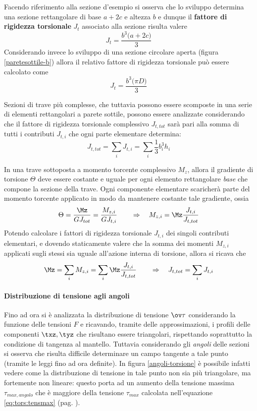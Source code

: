     		Facendo riferimento alla sezione d'esempio si osserva che lo sviluppo determina una sezione rettangolare di base $a+2c$ e altezza $b$ e dunque il \textbf{fattore di rigidezza torsionale} $J_t$ associato alla sezione risulta valere
    		\[ J_t = \frac{b^3\big(a+2c\big)}{3} \]
    		Considerando invece lo sviluppo di una sezione circolare aperta (figura \ref{paretesottile-b}) allora il relativo fattore di rigidezza torsionale può essere calcolato come
    		\[ J_t = \frac{b^3\big(\pi D\big)}{3}\]
    		
    		
    		Sezioni di trave più complesse, che tuttavia possono essere scomposte in una serie di elementi rettangolari a parete sottile, possono essere analizzate considerando che il fattore di rigidezza torsionale complessivo $J_{t,tot}$ sarà pari alla somma di tutti i contributi $J_{t,i}$ che ogni parte elementare determina:
    		\[ J_{t,tot} = \sum_i J_{t,i} = \sum_i \frac 1 3 b^3_ih_i \]
    		
    		\begin{dimostrazione}
    			In una trave sottoposta a momento torcente complessivo $M_z$, allora il gradiente di torsione $\Theta$ deve essere costante e uguale per ogni elemento rettangolare \textit{base} che compone la sezione della trave. Ogni componente elementare scaricherà parte del momento torcente applicato in modo da mantenere costante tale gradiente, ossia
    			\[ \Theta = \frac{\Mz}{GJ_{tot}} = \frac{M_{z,i}}{GJ_{t,i}} \qquad \Rightarrow \quad M_{z,i} = \Mz \frac{J_{t,i}}{J_{t,tot}} \]
    			Potendo calcolare i fattori di rigidezza torsionale $J_{t,i}$ dei singoli contributi elementari, e dovendo  staticamente valere che la somma dei momenti $M_{z,i}$ applicati sugli stessi sia uguale all'azione interna di torsione, allora si ricava che
    			\[ \Mz = \sum_i M_{z,i} = \sum_i \Mz \frac{J_{t,i}}{J_{t,tot}} \qquad \Rightarrow \quad J_{t,tot} = \sum_i J_{t,i} \]
    		\end{dimostrazione}
    	
    		\paragraph{Distribuzione di tensione agli angoli} Fino ad ora si è analizzata la distribuzione di tensione $\ov \tau$ considerando la funzione delle tensioni $F$ e ricavando, tramite delle approssimazioni, i profili delle componenti $\txz,\tyz$ che risultano essere triangolari, rispettando soprattutto la condizione di tangenza al mantello. Tuttavia considerando gli \textit{angoli} delle sezioni si osserva che risulta difficile determinare un campo tangente a tale punto (tramite le leggi fino ad ora definite). In figura \ref{angoli-torsione} è possibile infatti vedere come la distribuzione di tensione in tale punto non sia più triangolare, ma fortemente non lineare: questo porta ad un aumento della tensione massima $\tau_{max,angolo}$ che è maggiore della tensione $\tau_{max}$ calcolata nell'equazione \ref{eq:tors:tensmax} (pag. \pageref{eq:tors:tensmax}).
    		    	
